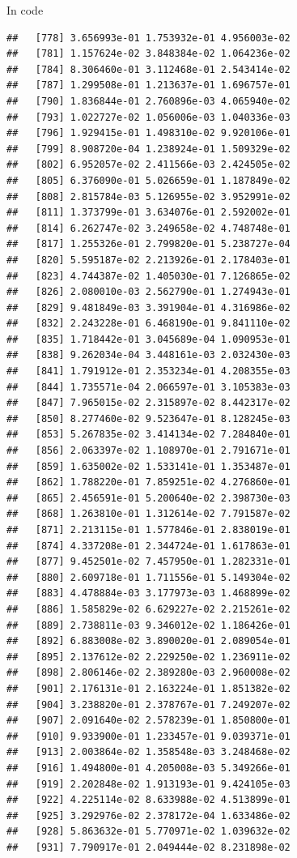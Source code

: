 \documentclass[ignorenonframetext,]{beamer}
\begin{document}
\begin{frame}[fragile]{In code}
\begin{verbatim}
##   [778] 3.656993e-01 1.753932e-01 4.956003e-02
##   [781] 1.157624e-02 3.848384e-02 1.064236e-02
##   [784] 8.306460e-01 3.112468e-01 2.543414e-02
##   [787] 1.299508e-01 1.213637e-01 1.696757e-01
##   [790] 1.836844e-01 2.760896e-03 4.065940e-02
##   [793] 1.022727e-02 1.056006e-03 1.040336e-03
##   [796] 1.929415e-01 1.498310e-02 9.920106e-01
##   [799] 8.908720e-04 1.238924e-01 1.509329e-02
##   [802] 6.952057e-02 2.411566e-03 2.424505e-02
##   [805] 6.376090e-01 5.026659e-01 1.187849e-02
##   [808] 2.815784e-03 5.126955e-02 3.952991e-02
##   [811] 1.373799e-01 3.634076e-01 2.592002e-01
##   [814] 6.262747e-02 3.249658e-02 4.748748e-01
##   [817] 1.255326e-01 2.799820e-01 5.238727e-04
##   [820] 5.595187e-02 2.213926e-01 2.178403e-01
##   [823] 4.744387e-02 1.405030e-01 7.126865e-02
##   [826] 2.080010e-03 2.562790e-01 1.274943e-01
##   [829] 9.481849e-03 3.391904e-01 4.316986e-02
##   [832] 2.243228e-01 6.468190e-01 9.841110e-02
##   [835] 1.718442e-01 3.045689e-04 1.090953e-01
##   [838] 9.262034e-04 3.448161e-03 2.032430e-03
##   [841] 1.791912e-01 2.353234e-01 4.208355e-03
##   [844] 1.735571e-04 2.066597e-01 3.105383e-03
##   [847] 7.965015e-02 2.315897e-02 8.442317e-02
##   [850] 8.277460e-02 9.523647e-01 8.128245e-03
##   [853] 5.267835e-02 3.414134e-02 7.284840e-01
##   [856] 2.063397e-02 1.108970e-01 2.791671e-01
##   [859] 1.635002e-02 1.533141e-01 1.353487e-01
##   [862] 1.788220e-01 7.859251e-02 4.276860e-01
##   [865] 2.456591e-01 5.200640e-02 2.398730e-03
##   [868] 1.263810e-01 1.312614e-02 7.791587e-02
##   [871] 2.213115e-01 1.577846e-01 2.838019e-01
##   [874] 4.337208e-01 2.344724e-01 1.617863e-01
##   [877] 9.452501e-02 7.457950e-01 1.282331e-01
##   [880] 2.609718e-01 1.711556e-01 5.149304e-02
##   [883] 4.478884e-03 3.177973e-03 1.468899e-02
##   [886] 1.585829e-02 6.629227e-02 2.215261e-02
##   [889] 2.738811e-03 9.346012e-02 1.186426e-01
##   [892] 6.883008e-02 3.890020e-01 2.089054e-01
##   [895] 2.137612e-02 2.229250e-02 1.236911e-02
##   [898] 2.806146e-02 2.389280e-03 2.960008e-02
##   [901] 2.176131e-01 2.163224e-01 1.851382e-02
##   [904] 3.238820e-01 2.378767e-01 7.249207e-02
##   [907] 2.091640e-02 2.578239e-01 1.850800e-01
##   [910] 9.933900e-01 1.233457e-01 9.039371e-01
##   [913] 2.003864e-02 1.358548e-03 3.248468e-02
##   [916] 1.494800e-01 4.205008e-03 5.349266e-01
##   [919] 2.202848e-02 1.913193e-01 9.424105e-03
##   [922] 4.225114e-02 8.633988e-02 4.513899e-01
##   [925] 3.292976e-02 2.378172e-04 1.633486e-02
##   [928] 5.863632e-01 5.770971e-02 1.039632e-02
##   [931] 7.790917e-01 2.049444e-02 8.231898e-02

\end{verbatim}
\end{frame}
\end{document}
